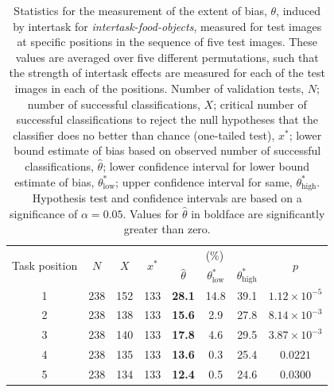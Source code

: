 \documentclass[12pt]{article}
\begin{document}
\begin{table}
\begin{center}
\begin{tabular}{c c c c c c c c }
	\toprule
	\multirow{2}{*}{Task position} & \multirow{2}{*}{$N$} & 
	\multirow{2}{*}{$X$} & \multirow{2}{*}{$x^*$} & \multicolumn{3}{c}{(\%)}
		& \multirow{2}{*}{$p$}\\ \cline{5-7}\noalign{\smallskip}
	& & & & $\hat{\theta}$ & $\theta^*_\mathrm{low}$ 
		& $\theta^*_\mathrm{high}$  \\
	\midrule
	1 & 238 & 152 & 133 & \textbf{28.1} & 14.8 & 39.1 
		& $1.12 \times 10^{-5}$\\
	2 & 238 & 138 & 133 & \textbf{15.6} & 2.9 & 27.8  
		& $8.14 \times 10^{-3}$\\
	3 & 238 & 140 & 133 & \textbf{17.8} & 4.6 & 29.5  
		& $3.87 \times 10^{-3}$\\
	4 & 238 & 135 & 133 & \textbf{13.6} & 0.3 & 25.4  
		& $0.0221$ \\
	5 & 238 & 134 & 133 & \textbf{12.4} & 0.5 & 24.6 & $0.0300$ \\
	\bottomrule
\end{tabular}
\caption{Statistics for the measurement of the extent of bias, $\theta$,
	induced by intertask for \textit{intertask-food-objects}, measured 
	for test images at specific positions in the sequence of five test images.
	These values are averaged over five different permutations, such that 
	the strength of intertask effects are measured for each of the test images
	in each of the positions.
	Number of validation tests, $N$; number of successful classifications, 
	$X$; critical number of successful classifications to reject the null 
	hypotheses that the classifier does no better than chance 
	(one-tailed test), $x^*$; 
	lower bound estimate of bias based on observed number of successful
	classifications, $\hat{\theta}$; lower confidence interval for lower
	bound estimate of bias, $\theta^*_\mathrm{low}$; upper confidence 
	interval for same, $\theta^*_\mathrm{high}$.  Hypothesis test and 
	confidence intervals are based on a significance of $\alpha=0.05$.
	Values for $\hat{\theta}$ in boldface are significantly greater than zero.
}
\label{table:theta_pos}
\end{center}
\end{table}
\end{document}

